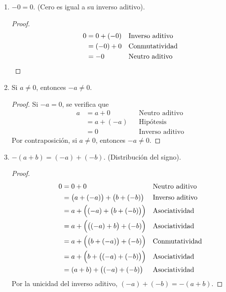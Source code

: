 \documentclass[11pt]{article}
\begin{document}
\begin{enumerate}[label=\alph*)]
 \item $-0 = 0$. (Cero es igual a su inverso aditivo).
 \begin{proof}
  \begin{align*}
   0 &= 0 + (-0) && \text{Inverso aditivo}\\
   &= (-0) + 0 && \text{Conmutatividad}\\
   &= -0 && \text{Neutro aditivo} \qedhere
  \end{align*}
 \end{proof}
%
 \item Si $a\neq 0$, entonces $-a\neq 0$.
 \begin{proof} 
  Si $-a=0$, se verifica que  \begin{align*}
   a &= a + 0 && \text{Neutro aditivo}\\
   &= a + (-a) && \text{Hipótesis}\\
   &= 0 && \text{Inverso aditivo}
  \end{align*} Por contraposición, si $a\neq 0$, entonces $-a\neq 0$.
 \end{proof}

 \item $-(a+b)=(-a)+(-b)$. (Distribución del signo).

 \begin{proof} 
  \begin{align*}
   0 &= 0 + 0 && \text{Neutro aditivo} \\
   &= \bigl(a+(-a)\bigr) + \bigl(b + (-b)\bigr) && \text{Inverso aditivo} \\
   &= a + \Bigl((-a)+ \bigl(b + (-b)\bigr)\Bigr) && \text{Asociatividad} \\
   &= a + \Bigl( \bigl((-a)+b\bigr) +(-b)\Bigr) && \text{Asociatividad} \\
   &= a + \Bigl( \bigl(b+(-a)\bigr) +(-b)\Bigr) && \text{Conmutatividad} \\
   &= a + \Bigl( b + \bigl( (-a)+(-b) \bigr) \Bigr) && \text{Asociatividad} \\
   &= (a+b) + \bigl((-a)+ (-b)\bigr) && \text{Asociatividad}
   \end{align*}
   Por la unicidad del inverso aditivo, $(-a)+ (-b)=-(a+b)$.  
 \end{proof}


\end{enumerate}
\end{document}
